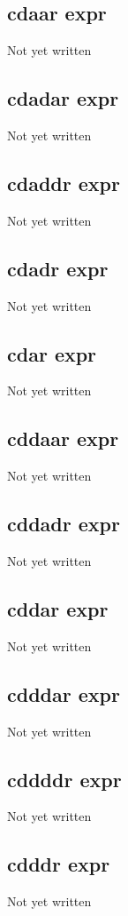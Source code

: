 \documentclass[a4paper,11pt]{article}
\begin{document}
{\subsection{\ttfamily cdaar expr}
   Not yet written

\subsection{\ttfamily cdadar expr}
   Not yet written

\subsection{\ttfamily cdaddr expr}
   Not yet written

\subsection{\ttfamily cdadr expr}
   Not yet written

\subsection{\ttfamily cdar expr}
   Not yet written

\subsection{\ttfamily cddaar expr}
   Not yet written

\subsection{\ttfamily cddadr expr}
   Not yet written

\subsection{\ttfamily cddar expr}
   Not yet written

\subsection{\ttfamily cdddar expr}
   Not yet written

\subsection{\ttfamily cddddr expr}
   Not yet written

\subsection{\ttfamily cdddr expr}
   Not yet written

}
\end{document}
